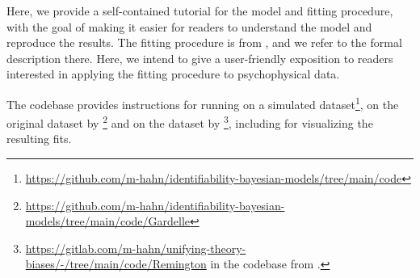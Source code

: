 Here, we provide a self-contained tutorial for the model and fitting procedure, with the goal of making it easier for readers to understand the model and reproduce the results.
The fitting procedure is from \citet{hahn2024unifying}, and we refer to the formal description there.
Here, we intend to give a user-friendly exposition to readers interested in applying the fitting procedure to psychophysical data.

The codebase provides instructions for running on a simulated dataset\footnote{\url{https://github.com/m-hahn/identifiability-bayesian-models/tree/main/code}}, on the original dataset by \citet{deGardelle2010AnOI}\footnote{\url{https://github.com/m-hahn/identifiability-bayesian-models/tree/main/code/Gardelle}} and on the dataset by \citet{Remington2018LateBI}\footnote{\url{https://gitlab.com/m-hahn/unifying-theory-biases/-/tree/main/code/Remington} in the codebase from \citet{hahn2024unifying}.}, including for visualizing the resulting fits.

